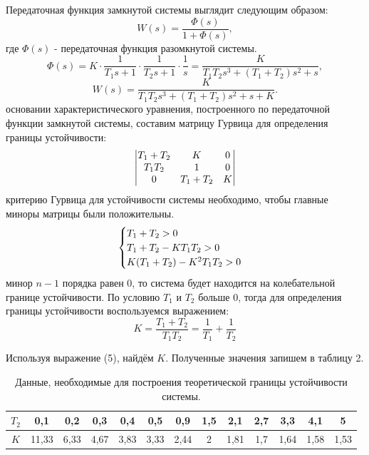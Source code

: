 \documentclass[12pt,a4paper]{article}
\begin{document}
 
Передаточная функция замкнутой системы выглядит следующим образом:
\begin{equation} W(s) = \frac{\Phi(s)}{1 + \Phi(s)}, \end{equation}
где $\Phi(s)$ - передаточная функция разомкнутой системы.
\begin{equation} 
\Phi(s) = K\cdot\frac{1}{T_1s + 1}\cdot\frac{1}{T_2s + 1}\cdot\frac{1}{s} = \frac{K}{T_1T_2s^3 + (T_1 + T_2)s^2 +s},
\end{equation}
 \begin{equation} W(s) = \frac{K}{T_1T_2s^3 + (T_1 + T_2)s^2 +s + K}. \end{equation}
 основании характеристического уравнения, построенного по передаточной функции замкнутой системы, составим матрицу Гурвица для определения границы устойчивости:
\[
\begin{vmatrix}
$$T_1 + T_2$$ & $$K$$ & 0\\
$$T_1T_2$$ & 1 & 0\\
0 & $$T_1 + T_2$$ & $$K$$
\end{vmatrix}
\]
 критерию Гурвица для устойчивости системы необходимо, чтобы главные миноры матрицы были положительны. 
\begin{equation}
    \begin{cases}
        $$T_1 + T_2 > 0$$\\
        $$T_1 + T_2 - KT_1T_2 > 0$$\\
        $$K(T_1 + T_2) - K^2T_1T_2 > 0$$
    \end{cases}
\end{equation}
 минор $n - 1$ порядка равен 0, то система будет находится на колебательной границе устойчивости. По условию $T_1$ и $T_2$ больше 0, тогда для определения границы устойчивости воспользуемся выражением:
\begin{equation}
    K = \frac{T_1 + T_2}{T_1T_2} =  \frac{1}{T_1} + \frac{1}{T_2}
\end{equation}
    
Используя выражение (5), найдём $K$. Полученные значения запишем в таблицу 2.
\begin{table}[h!]
	\caption{Данные, необходимые для построения теоретической границы устойчивости системы.}
	\renewcommand{\arraystretch}{1.8} %
	\begin{tabular}{|c|c|c|c|c|c|c|c|c|c|c|c|c|}
		\hline $T_2$ & 0,1 & 0,2 & 0,3 & 0,4 & 0,5 & 0,9 & 1,5 & 2,1 & 2,7 & 3,3 & 4,1 & 5\\
		\hline $K$ & 11,33 & 6,33 & 4,67 & 3,83 & 3,33 & 2,44 & 2 & 1,81 & 1,7 & 1,64 & 1,58 & 1,53\\
		\hline
	\end{tabular}	
\end{table}  
 
\end{document}
